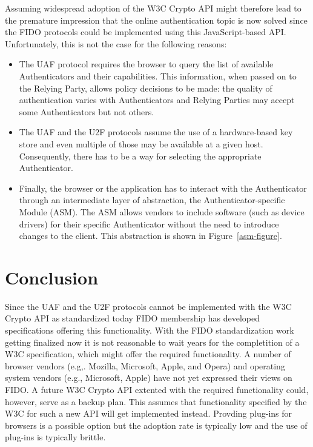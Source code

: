 \documentclass[peerreview, a4paper, 7pt]{IEEEtran}
\begin{document}
Assuming widespread adoption of the W3C Crypto API might therefore lead to the premature impression that the online authentication topic is now solved since the FIDO protocols could be implemented using this JavaScript-based API. Unfortunately, this is not the case for the following reasons:
\begin{itemize}
  \item The UAF protocol requires the browser to query the list of available Authenticators and their capabilities. This information, when passed on to the Relying Party, allows policy decisions to be made: the quality of authentication varies with Authenticators and Relying Parties may accept some Authenticators but not others.
 
  \item The UAF and the U2F protocols assume the use of a hardware-based key store and even multiple of those may be available at a given host. Consequently, there has to be a way for selecting the appropriate Authenticator. 
  
  \item Finally, the browser or the application has to interact with the Authenticator through an intermediate layer of abstraction, the Authenticator-specific Module (ASM). The ASM allows vendors to include software (such as device drivers) for their specific Authenticator without the need to introduce changes to the client. This abstraction is shown in Figure~\ref{asm-figure}.

\end{itemize} 


\section{Conclusion}
Since the UAF and the U2F protocols cannot be implemented with the W3C Crypto API as standardized today FIDO membership has developed specifications offering this functionality. With the FIDO standardization work getting finalized now it is not reasonable to wait years for the completition of a W3C specification, which might offer the required functionality. A number of browser vendors (e.g,. Mozilla, Microsoft, Apple, and Opera) and operating system vendors (e.g., Microsoft, Apple) have not yet expressed their views on FIDO. A future W3C Crypto API extented with the required functionality could, however, serve as a backup plan. This assumes that functionality specified by the W3C for such a new API will get implemented instead. Provding plug-ins for browsers is a possible option but the adoption rate is typically low and the use of plug-ins is typically brittle. 
\end{document}
